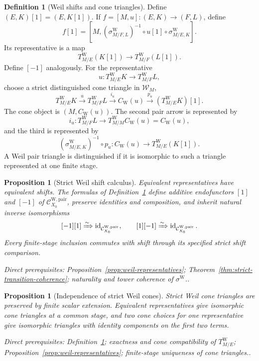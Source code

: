 \documentclass[10pt]{article}
\newtheorem{proposition}[theorem]{Proposition}
\theoremstyle{definition}
\newtheorem{definition}[theorem]{Definition}
\newcommand{\PairW}{\mathcal C_{X_0}^{\mathrm{W,pair}}}
\newcommand{\depends}[1]{\par\smallskip\noindent\textit{Direct prerequisites:} #1.}
\begin{document}
\begin{definition}[Weil shifts and cone triangles]\label{def:weil-cones}
Define $(E,K)[1]=(E,K[1])$.  If $f=[M,u]:(E,K)\to(F,L)$, define
\[
 f[1]=\left[M,
 (\sigma^{\mathrm W}_{M/F,L})^{-1}\circ u[1]\circ
 \sigma^{\mathrm W}_{M/E,K}\right].
\]
Its representative is a map
\[
 T^{\mathrm W}_{M/E}(K[1])\longrightarrow
 T^{\mathrm W}_{M/F}(L[1]).
\]
Define $[-1]$ analogously.  For the representative
\[
 u:T^{\mathrm W}_{M/E}K\longrightarrow T^{\mathrm W}_{M/F}L,
\]
choose a strict distinguished cone triangle in $\mathcal W_M$,
\[
 T^{\mathrm W}_{M/E}K\xrightarrow{u}T^{\mathrm W}_{M/F}L
 \xrightarrow{i_u} C_{\mathrm W}(u)
 \xrightarrow{p_u}(T^{\mathrm W}_{M/E}K)[1].
\]
The cone object is $(M,C_{\mathrm W}(u))$.  The second pair arrow is
represented by
\[
 i_u:T^{\mathrm W}_{M/F}L\longrightarrow
 T^{\mathrm W}_{M/M}C_{\mathrm W}(u)=C_{\mathrm W}(u),
\]
and the third is represented by
\[
 (\sigma^{\mathrm W}_{M/E,K})^{-1}\circ p_u:
 C_{\mathrm W}(u)\longrightarrow T^{\mathrm W}_{M/E}(K[1]).
\]
A Weil pair triangle is distinguished if it is isomorphic to such a
triangle represented at one finite stage.
\end{definition}

\begin{proposition}[Strict Weil shift calculus]
\label{prop:weil-shift-calculus}
Equivalent representatives have equivalent shifts.  The formulas of
Definition~\ref{def:weil-cones} define additive endofunctors $[1]$ and
$[-1]$ of $\PairW$, preserve identities and composition, and inherit
natural inverse isomorphisms
\[
 [-1][1]\xRightarrow{\sim}\operatorname{id}_{\PairW},
 \qquad [1][-1]\xRightarrow{\sim}\operatorname{id}_{\PairW}.
\]
Every finite-stage inclusion commutes with shift through its specified
strict shift comparison.
\depends{Proposition~\ref{prop:weil-representatives};
Theorem~\ref{thm:strict-transition-coherence}; naturality and tower
coherence of $\sigma^{\mathrm W}$.}
\end{proposition}

\begin{proposition}[Independence of strict Weil cones]
\label{prop:weil-cone-independence}
Strict Weil cone triangles are preserved by finite scalar extension.
Equivalent representatives give isomorphic cone triangles at a common
stage, and two cone choices for one representative give isomorphic
triangles with identity components on the first two terms.
\depends{Definition~\ref{def:weil-cones}; exactness and cone compatibility
of $T^{\mathrm W}_{M/E}$; Proposition~\ref{prop:weil-representatives};
finite-stage uniqueness of cone triangles.}
\end{proposition}
\end{document}
